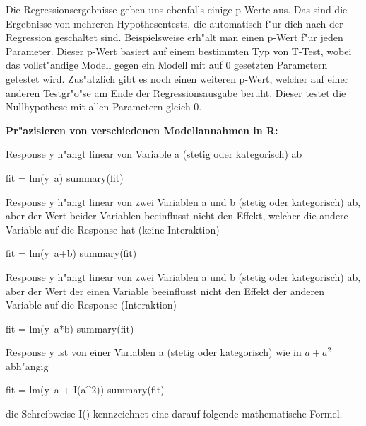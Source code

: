 \documentclass[a4paper,twoside]{tufte-book}\usepackage[]{graphicx}\usepackage[]{color}
\begin{document}
Die Regressionsergebnisse geben uns ebenfalls einige p-Werte aus. Das sind die Ergebnisse von mehreren Hypothesentests, die automatisch f"ur dich nach der Regression geschaltet sind. Beispielsweise erh"alt man einen p-Wert f"ur jeden Parameter. Dieser p-Wert basiert auf einem bestimmten Typ von T-Test, wobei das vollst"andige Modell gegen ein Modell mit auf 0 gesetzten Parametern getestet wird. Zus"atzlich gibt es noch einen weiteren p-Wert, welcher auf einer anderen Testgr"o"se am Ende der Regressionsausgabe beruht. Dieser testet die Nullhypothese mit allen Parametern gleich 0.

\vspace{1cm}
\begin{fullwidth}
\begin{mdframed}
    
\textbf{Pr"azisieren von verschiedenen Modellannahmen in R:} 

Response y h"angt linear von Variable a (stetig oder kategorisch) ab

\begin{Schunk}
\begin{Sinput}
fit = lm(y~a)
summary(fit)
\end{Sinput}
\end{Schunk}

Response y h"angt linear von zwei Variablen a und b (stetig oder kategorisch) ab, aber der Wert beider Variablen beeinflusst nicht den Effekt, welcher die andere Variable auf die Response hat (keine Interaktion)

\begin{Schunk}
\begin{Sinput}
fit = lm(y~a+b)
summary(fit)
\end{Sinput}
\end{Schunk}

Response y h"angt linear von zwei Variablen a und b (stetig oder kategorisch) ab, aber der Wert der einen Variable beeinflusst nicht den Effekt der anderen Variable auf die Response (Interaktion)

\begin{Schunk}
\begin{Sinput}
fit = lm(y~a*b)
summary(fit)
\end{Sinput}
\end{Schunk}

Response y ist von einer Variablen a (stetig oder kategorisch) wie in $a + a^2$ abh"angig

\begin{Schunk}
\begin{Sinput}
fit = lm(y~a + I(a^2))
summary(fit)
\end{Sinput}
\end{Schunk}

die Schreibweise I() kennzeichnet eine darauf folgende mathematische Formel. 

\end{mdframed}
\end{fullwidth}
\end{document}
